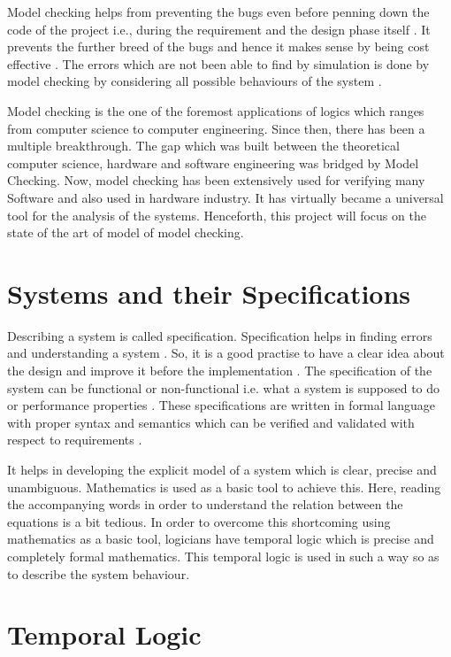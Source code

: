 \documentclass[a4paper,10pt]{report}
\begin{document}
Model checking helps from preventing the bugs even before penning down the code of the project i.e., during the requirement and the design phase itself \cite{ErichGamma1995}. It prevents the further breed of the bugs and hence it makes sense by being cost effective \cite{Havelund}. The errors which are not been able to find by simulation is done by model checking by considering all possible behaviours of the system \cite{Havelund}. 

Model checking is the one of the foremost applications of logics which ranges from computer science to computer engineering. Since then, there has been a multiple breakthrough. The gap which was built between the theoretical computer science, hardware and software engineering was bridged by Model Checking. Now, model checking has been extensively used for verifying many Software and also used in hardware industry. It has virtually became a universal tool for the analysis of the systems. Henceforth, this project will focus on the state of the art of model of model checking.

\section{Systems and their Specifications}
\label{Sys and Spec}

Describing a system is called specification. Specification helps in finding errors and understanding a system \cite{Wang2007}. So, it is a good practise to have a clear idea about the design and improve it before the implementation \cite{ErichGamma1995}. The specification of the system can be functional or non-functional i.e. what a system is supposed to do or performance properties \cite{Wang2007}. These specifications are written in formal language with proper syntax and semantics which can be verified and validated with respect to requirements \cite{D.Jackson}.

It helps in developing the explicit model of a system which is clear, precise and unambiguous. Mathematics is used as a basic tool to achieve this. Here, reading the accompanying words in order to understand the relation between the equations is a bit tedious. In order to overcome this shortcoming using mathematics as a basic tool, logicians have temporal logic which is precise and completely formal mathematics. This temporal logic is used in such a way so as to describe the system behaviour. 

\section{Temporal Logic} 
\label{Temp Logic}
\end{document}
